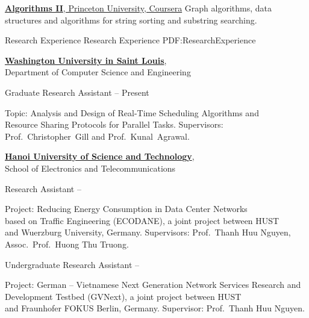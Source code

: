 \documentclass[letterpaper,MMMyyyy,nonstopmode]{simpleresumecv}
\begin{document}
\begin{Body}
\BigGap
\Entry
\href{https://www.coursera.org/learn/algorithms-part2}
{\textbf{Algorithms II}, Princeton University, Coursera}
\hfill {}
\BulletItem
Graph algorithms, data structures and algorithms for string sorting and substring searching.


\Section
{Research Experience}
{Research Experience}
{PDF:ResearchExperience}

\Entry
\href{https://cse.wustl.edu/Pages/default.aspx}
{\textbf{Washington University in Saint Louis}}, \\
Department of Computer Science and Engineering

\Gap
\BulletItem
Graduate Research Assistant
\hfill
{} -- Present
\begin{Detail}
\SubBulletItem
Topic: Analysis and Design of Real-Time Scheduling Algorithms and \\
Resource Sharing Protocols for Parallel Tasks. 
\SubBulletItem
Supervisors:
Prof.~Christopher~Gill and Prof.~Kunal~Agrawal.
\end{Detail}

\BigGap
\Entry
\href{https://en.hust.edu.vn/home}
{\textbf{Hanoi University of Science and Technology}}, \\
School of Electronics and Telecommunications

\Gap
\BulletItem Research Assistant
\hfill
{} -- 
\begin{Detail}
\SubBulletItem
Project: Reducing Energy Consumption in Data Center Networks \\
based on Traffic Engineering (ECODANE), a joint project between HUST \\
and Wuerzburg University, Germany. 
\SubBulletItem
Supervisors: Prof.~Thanh Huu Nguyen, Assoc.~Prof.~Huong Thu Truong.
\end{Detail}

\Gap
\BulletItem Undergraduate Research Assistant
\hfill
{} -- 
\begin{Detail}
\SubBulletItem
Project: German – Vietnamese Next Generation Network Services Research and \\
Development Testbed (GVNext), a joint project between HUST \\
and Fraunhofer FOKUS Berlin, Germany.
\SubBulletItem
Supervisor: Prof.~Thanh Huu Nguyen.
\end{Detail}


\end{Body}
\end{document}
